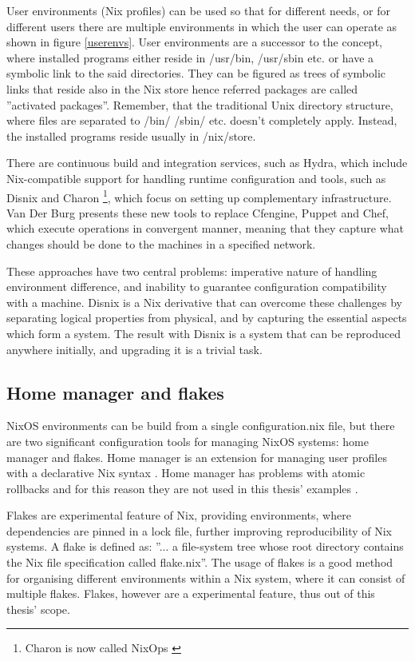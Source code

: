 User environments (Nix profiles) can be used so that for different needs, or for different users there are multiple environments in which the user can operate as shown in figure \ref{userenvs}. User environments are a successor to the concept, where installed programs either reside in /usr/bin, /usr/sbin etc. or have a symbolic link to the said directories. They can be figured as trees of symbolic links that reside also in the Nix store hence referred packages are called ''activated packages''. Remember, that the traditional Unix directory structure, where files are separated to /bin/ /sbin/ etc. doesn't completely apply. Instead, the installed programs reside usually in /nix/store. \cite{dolstra2008nixos}

There are continuous build and integration services, such as Hydra, which include Nix-compatible support for handling runtime configuration and tools, such as Disnix and Charon \footnote{Charon is now called NixOps \cite{githubNixNixpkgsNixOS}}, which focus on setting up complementary infrastructure. Van Der Burg presents these new tools to replace Cfengine, Puppet and Chef, which execute operations in convergent manner, meaning that they capture what changes should be done to the machines in a specified network. \cite{van2013reference}

These approaches have two central problems: imperative nature of handling environment difference, and inability to guarantee configuration compatibility with a machine. Disnix is a Nix derivative that can overcome these challenges by separating logical properties from physical, and by capturing the essential aspects which form a system. The result with Disnix is a system that can be reproduced anywhere initially, and upgrading it is a trivial task. \cite{van2013reference}

\subsection{Home manager and flakes}

NixOS environments can be build from a single configuration.nix file, but there are two significant configuration tools for managing NixOS systems: home manager and flakes. Home manager is an extension for managing user profiles with a declarative Nix syntax  \cite{nixcommunityHomeManager}. Home manager has problems with atomic rollbacks and for this reason they are not used in this thesis' examples \cite{nixcommunityHomeManager}.

Flakes are experimental feature of Nix, providing environments, where dependencies are pinned in a lock file, further improving reproducibility of Nix systems. A flake is defined as: ''... a file-system tree whose root directory contains the Nix file specification called flake.nix''. The usage of flakes is a good method for organising different environments within a Nix system, where it can consist of multiple flakes. Flakes, however are a experimental feature, thus out of this thesis' scope. \cite{nixosFlakesNixOS}
